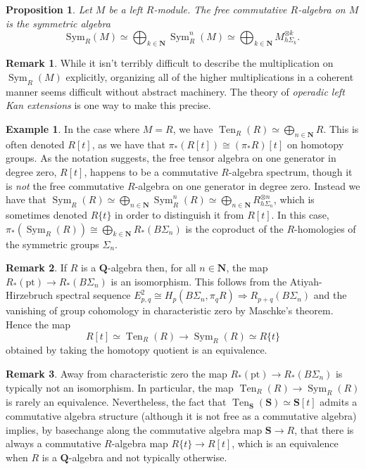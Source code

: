 \documentclass{article}
\newtheorem{proposition}{Proposition}[subsection]
\theoremstyle{definition}
\newtheorem{example}{Example}[subsection]
\newtheorem{remark}{Remark}[subsection]
\newcommand{\NN}{\mathbf{N}}
\newcommand{\QQ}{\mathbf{Q}}
\renewcommand{\SS}{\mathbf{S}}
\newcommand{\too}{\longrightarrow}
\DeclareMathOperator{\Sym}{Sym}
\DeclareMathOperator{\Ten}{Ten}
\newcommand{\pt}{\mathrm{pt}}
\begin{document}
\begin{proposition}{\em \cite[Example 3.1.3.14]{HA}}
Let $M$ be a left $R$-module.
The free commutative $R$-algebra on $M$ is the symmetric algebra
\[
\mathrm{Sym}_R(M)\simeq\bigoplus_{k\in\NN}\Sym_R^n(M)\simeq\bigoplus_{k\in\NN} M^{\otimes k}_{h\Sigma_k}.
\]
\end{proposition}
\begin{remark}
While it isn't terribly difficult to describe the multiplication on $\Sym_R(M)$ explicitly, organizing all of the higher multiplications in a coherent manner seems difficult without abstract machinery.
The theory of {\em operadic left Kan extensions} \cite{HA} is one way to make this precise.
\end{remark}

\begin{example}
In the case where $M=R$, we have $\Ten_R(R)\simeq\bigoplus_{n\in\NN} R$.
This is often denoted $R[t]$, as we have that $\pi_*(R[t])\cong(\pi_* R)[t]$ on homotopy groups.
As the notation suggests, the free tensor algebra on one generator in degree zero, $R[t]$, happens to be a commutative $R$-algebra spectrum, though it is {\em not} the free commutative $R$-algebra on one generator in degree zero.
Instead we have that $\Sym_R(R)\simeq\bigoplus_{n\in\NN} \Sym^n_R(R)\simeq \bigoplus_{n\in\NN} R^{\otimes n}_{h\Sigma_n}$,
which is sometimes denoted $R\{t\}$ in order to distinguish it from $R[t]$.
In this case, $\pi_*(\Sym_R(R))\cong\bigoplus_{k\in\NN} R_*(B\Sigma_n)$
is the coproduct of the $R$-homologies of the symmetric groups $\Sigma_n$.
\end{example}

\begin{remark}
If $R$ is a $\QQ$-algebra then, for all $n\in\NN$, the map $R_*(\pt)\to R_*(B\Sigma_n)$ is an isomorphism.
This follows from the Atiyah-Hirzebruch spectral sequence $E^2_{p,q}\cong H_p(B\Sigma_n,\pi_q R)\Rightarrow R_{p+q}(B\Sigma_n)$ and the vanishing of group cohomology in characteristic zero by Maschke's theorem.
Hence the map
\[
R[t]\simeq\Ten_R(R)\too\Sym_R(R)\simeq R\{ t\}
\]
obtained by taking the homotopy quotient is an equivalence.
\end{remark}

\begin{remark}
Away from characteristic zero the map $R_*(\pt)\to R_*(B\Sigma_n)$ is typically not an isomorphism.
In particular, the map $\Ten_R(R)\to\Sym_R(R)$ is rarely an equivalence.
Nevertheless, the fact that $\Ten_\SS(\SS)\simeq\SS[t]$ admits a commutative algebra structure (although it is not free as a commutative algebra) implies, by basechange along the commutative algebra map $\SS\to R$, that there is always a commutative $R$-algebra map $R\{t\}\to R[t]$, which is an equivalence when $R$ is a $\QQ$-algebra and not typically otherwise.
\end{remark}
\end{document}
